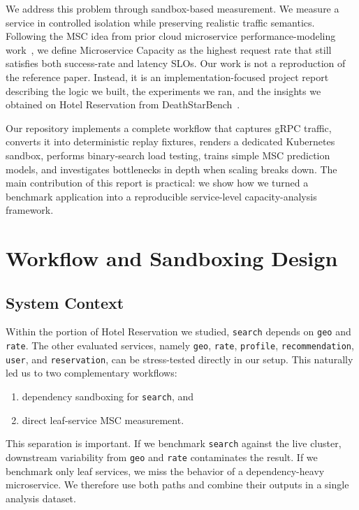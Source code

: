 \documentclass[conference]{IEEEtran}
\begin{document}
We address this problem through sandbox-based measurement. We measure a service in controlled isolation while preserving realistic traffic semantics. Following the MSC idea from prior cloud microservice performance-modeling work~\cite{jindal2019}, we define Microservice Capacity as the highest request rate that still satisfies both success-rate and latency SLOs. Our work is not a reproduction of the reference paper. Instead, it is an implementation-focused project report describing the logic we built, the experiments we ran, and the insights we obtained on Hotel Reservation from DeathStarBench~\cite{gan2019}.

Our repository implements a complete workflow that captures gRPC traffic, converts it into deterministic replay fixtures, renders a dedicated Kubernetes sandbox, performs binary-search load testing, trains simple MSC prediction models, and investigates bottlenecks in depth when scaling breaks down. The main contribution of this report is practical: we show how we turned a benchmark application into a reproducible service-level capacity-analysis framework.

\section{Workflow and Sandboxing Design}
\subsection{System Context}
Within the portion of Hotel Reservation we studied, \texttt{search} depends on \texttt{geo} and \texttt{rate}. The other evaluated services, namely \texttt{geo}, \texttt{rate}, \texttt{profile}, \texttt{recommendation}, \texttt{user}, and \texttt{reservation}, can be stress-tested directly in our setup. This naturally led us to two complementary workflows:
\begin{enumerate}
\item dependency sandboxing for \texttt{search}, and
\item direct leaf-service MSC measurement.
\end{enumerate}

This separation is important. If we benchmark \texttt{search} against the live cluster, downstream variability from \texttt{geo} and \texttt{rate} contaminates the result. If we benchmark only leaf services, we miss the behavior of a dependency-heavy microservice. We therefore use both paths and combine their outputs in a single analysis dataset.
\end{document}

